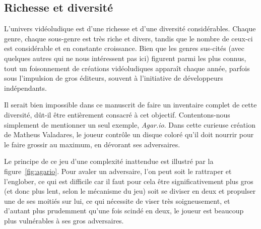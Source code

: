 	\subsection{Richesse et diversité}
	L'univers vidéoludique est d'une richesse et d'une diversité considérables. Chaque genre, chaque sous-genre est très riche et divers, tandis que le nombre de ceux-ci est considérable et en constante croissance. Bien que les genres sus-cités (avec quelques autres qui ne nous intéressent pas ici) figurent parmi les plus connus, tout un foisonnement de créations vidéoludiques apparaît chaque année, parfois sous l'impulsion de gros éditeurs, souvent à l'initiative de développeurs indépendants.
	
	Il serait bien impossible dans ce manuscrit de faire un inventaire complet de cette diversité, dût-il être entièrement consacré à cet objectif. Contentons-nous simplement de mentionner un seul exemple, \emph{Agar.io}. Dans cette curieuse création de Matheus Valadares, le joueur contrôle un disque coloré qu'il doit nourrir pour le faire grossir au maximum, en dévorant ses adversaires.
	
	Le principe de ce jeu d'une complexité inattendue est illustré par la figure~\ref{fig:agario}. Pour avaler un adversaire, l'on peut soit le rattraper et l'englober, ce qui est difficile car il faut pour cela être significativement plus gros (et donc plus lent, selon le mécanisme du jeu) soit se diviser en deux et propulser une de ses moitiés sur lui, ce qui nécessite de viser très soigneusement, et d'autant plus prudemment qu'une fois scindé en deux, le joueur est beaucoup plus vulnérables à ses gros adversaires.
	
